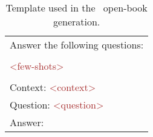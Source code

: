 
\begin{table}[t]
    \centering    

   \begin{tabularx}{\linewidth}{X}
    \toprule
    
\ttfamily
Answer the following questions: \\\\
\ttfamily
\textcolor{brown}{<few-shots>} \\\\
\ttfamily
Context: \textcolor{brown}{<context>} \\
\ttfamily
Question: \textcolor{brown}{<question>} \\
\ttfamily
Answer:
\\
    \bottomrule
\end{tabularx}

    \caption{Template used in the \naive\ open-book generation.}
    \label{template:opn}
\end{table}
